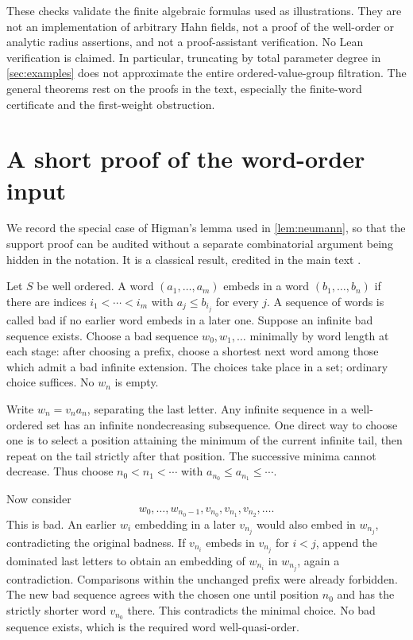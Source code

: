 \documentclass[11pt,letterpaper]{article}
\theoremstyle{definition}
\theoremstyle{remark}
\numberwithin{equation}{section}
\begin{document}
These checks validate the finite algebraic formulas used as illustrations.
They are not an implementation of arbitrary Hahn fields, not a proof of the
well-order or analytic radius assertions, and not a proof-assistant
verification. No Lean verification is claimed. In particular, truncating by
total parameter degree in \cref{sec:examples} does not approximate the
entire ordered-value-group filtration. The general theorems rest on the
proofs in the text, especially the finite-word certificate and the
first-weight obstruction.

\appendix
\section{A short proof of the word-order input}\label{app:higman}
We record the special case of Higman's lemma used in
\cref{lem:neumann}, so that the support proof can be audited without a
separate combinatorial argument being hidden in the notation. It is a
classical result, credited in the main text \cite{Higman}.

Let $S$ be well ordered. A word $(a_1,\ldots,a_m)$ embeds in a word
$(b_1,\ldots,b_n)$ if there are indices
$i_1<\cdots<i_m$ with $a_j\le b_{i_j}$ for every $j$. A sequence of words
is called bad if no earlier word embeds in a later one. Suppose an infinite
bad sequence exists. Choose a bad sequence $w_0,w_1,\ldots$ minimally by
word length at each stage: after choosing a prefix, choose a shortest next
word among those which admit a bad infinite extension. The choices take
place in a set; ordinary choice suffices. No $w_n$ is empty.

Write $w_n=v_n a_n$, separating the last letter. Any infinite sequence in a
well-ordered set has an infinite nondecreasing subsequence. One direct way
to choose one is to select a position attaining the minimum of the current
infinite tail, then repeat on the tail strictly after that position. The
successive minima cannot decrease. Thus choose
$n_0<n_1<\cdots$ with $a_{n_0}\le a_{n_1}\le\cdots$.

Now consider
\[
 w_0,\ldots,w_{n_0-1},v_{n_0},v_{n_1},v_{n_2},\ldots.
\]
This is bad. An earlier $w_i$ embedding in a later $v_{n_j}$ would also
embed in $w_{n_j}$, contradicting the original badness. If
$v_{n_i}$ embeds in $v_{n_j}$ for $i<j$, append the dominated last letters
to obtain an embedding of $w_{n_i}$ in $w_{n_j}$, again a contradiction.
Comparisons within the unchanged prefix were already forbidden. The new
bad sequence agrees with the chosen one until position $n_0$ and has the
strictly shorter word $v_{n_0}$ there. This contradicts the minimal choice.
No bad sequence exists, which is the required word well-quasi-order.
\end{document}
